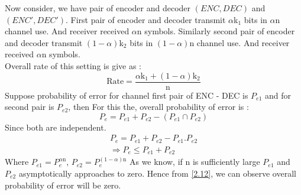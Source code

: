 \documentclass{article}
\begin{document}
%  
%  
  Now consider, we have pair of encoder and decoder $\left( ENC, DEC\right)$ and $\left( ENC', DEC'\right)$. First pair of encoder and decoder transmit $\alpha$k$_{1}$  bits in $\alpha$n channel use. And receiver received $\alpha$n symbols. Similarly second pair of  encoder and decoder transmit $ \left (1 - \alpha \right)$k$_{2}$  bits in $ \left( 1 -\alpha \right)$n channel use. And receiver received $\alpha$n symbols. \\ Overall rate of this setting is give as :
  \begin{equation} 
  	 \text{Rate} = \frac{ \alpha \text{k}_1 + (1 - \alpha)\text{k}_2}{\text{n}}
  	\end{equation}
  Suppose probability of error for channel first pair of ENC - DEC is $P_{e1}$ and for second pair is $P_{e2}$, then
  For this the, overall probability of error  is :
  \begin{equation}
  	P_e = P_{e1} + P_{e2} -( P_{e1} \cap P_{e2})  \label{2.12}
  	\end{equation}
 Since both are independent.
  \begin{align}
  	P_e = P_{e1} + P_{e2} - P_{e1}.P_{e2}  \label{2.13} \\
  	\Rightarrow P_{e} \leq P_{e1} + P_{e2} \label{2.14}
  \end{align}
Where $P_{e1} = P_{e}^{\alpha \text{n}}$, $P_{e2} = P_{e}^{\left (1 - \alpha \right ) \text{n}}$ 
As we know, if n is sufficiently large $P_{e1}$ and $P_{e2}$ asymptotically approaches to zero. Hence from \ref{2.12}, we can observe overall probability of error will be zero.
 
  
  
  
  
\end{document}
